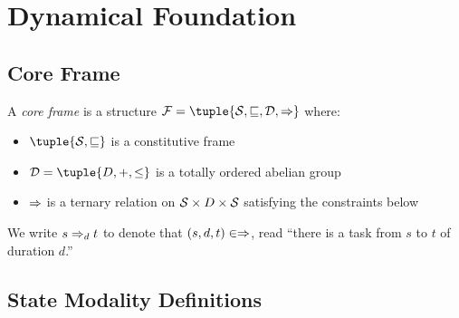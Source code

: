 \documentclass[../LogosReference.tex]{subfiles}
\begin{document}

\section{Dynamical Foundation}\label{sec:core-semantics}


\subsection{Core Frame}\label{sec:core-frame}

\begin{definition}\label{def:core-frame}
	A \emph{core frame} is a structure $\mframe = \tuple{\statespace, \parthood, \temporalorder, \taskrel}$ where:
	\begin{itemize}
		\item $\tuple{\statespace, \parthood}$ is a constitutive frame
		\item $\temporalorder = \tuple{D, +, \leq}$ is a totally ordered abelian group
		\item $\Rightarrow$ is a ternary relation on $\mathcal{S} \times D \times \mathcal{S}$ satisfying the constraints below
	\end{itemize}
\end{definition}

\begin{notation}
	We write $s \Rightarrow_{d} t$ to denote that $(s, d, t) \in \Rightarrow$, read ``there is a task from $s$ to $t$ of duration $d$.''
\end{notation}


\subsection{State Modality Definitions}\label{sec:state-modality}
\end{document}
